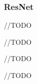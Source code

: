 \subsubsection{ResNet}\label{resnet}
//TODO

\label{resnet18}
//TODO


\label{resnet50}
//TODO


\label{resnetXX}
//TODO